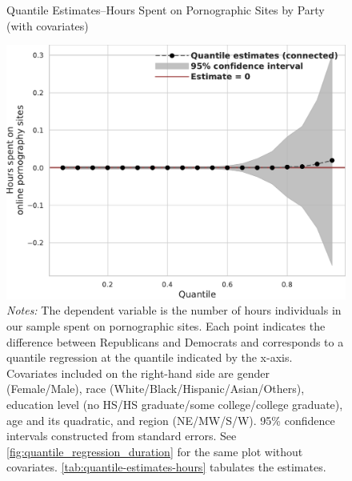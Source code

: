 \documentclass[12pt, letterpaper]{article}
\begin{document}
\begin{figure}[ht]
	\centering
	\caption{Quantile Estimates--Hours Spent on Pornographic Sites by Party (with covariates)}
	\includegraphics[width=.55\linewidth]{figs/quantile_reg_covariates_duration_adult.pdf}
	\caption*{\footnotesize \emph{Notes:} 
		The dependent variable is the number of hours individuals in our sample spent on pornographic sites.
		Each point indicates the difference between Republicans and Democrats and corresponds to a quantile regression at the quantile indicated by the x-axis.
		Covariates included on the right-hand side are gender (Female/Male), race (White/Black/Hispanic/Asian/Others), education level (no HS/HS graduate/some college/college graduate), age and its quadratic, and region (NE/MW/S/W).
		95\% confidence intervals constructed from standard errors.
		See \cref{fig:quantile_regression_duration} for the same plot without covariates.
  \cref{tab:quantile-estimates-hours} tabulates the estimates.
	}
	\label{fig:quantile_regression_duration_covariates}
\end{figure}
\end{document}
